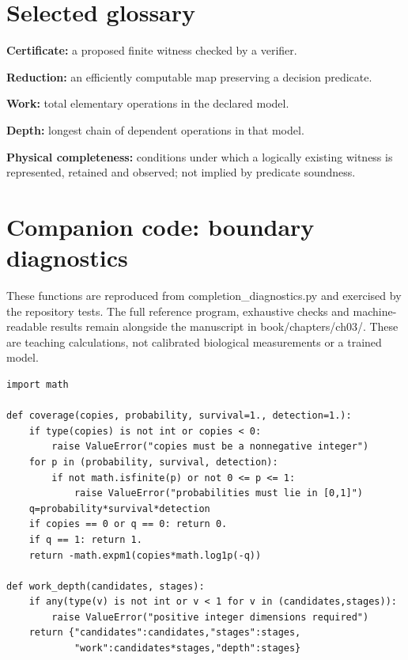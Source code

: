 \section{Selected glossary}\label{selected-glossary}

\textbf{Certificate:} a proposed finite witness checked by a verifier.

\textbf{Reduction:} an efficiently computable map preserving a decision
predicate.

\textbf{Work:} total elementary operations in the declared model.

\textbf{Depth:} longest chain of dependent operations in that model.

\textbf{Physical completeness:} conditions under which a logically
existing witness is represented, retained and observed; not implied by
predicate soundness.

\section{Companion code: boundary
diagnostics}\label{appendix-a.-executable-boundary-diagnostics}

These functions are reproduced from completion\_diagnostics.py and
exercised by the repository tests. The full reference program,
exhaustive checks and machine-readable results remain alongside the
manuscript in book/chapters/ch03/. These are teaching calculations, not
calibrated biological measurements or a trained model.

\begin{verbatim}
import math

def coverage(copies, probability, survival=1., detection=1.):
    if type(copies) is not int or copies < 0:
        raise ValueError("copies must be a nonnegative integer")
    for p in (probability, survival, detection):
        if not math.isfinite(p) or not 0 <= p <= 1:
            raise ValueError("probabilities must lie in [0,1]")
    q=probability*survival*detection
    if copies == 0 or q == 0: return 0.
    if q == 1: return 1.
    return -math.expm1(copies*math.log1p(-q))

def work_depth(candidates, stages):
    if any(type(v) is not int or v < 1 for v in (candidates,stages)):
        raise ValueError("positive integer dimensions required")
    return {"candidates":candidates,"stages":stages,
            "work":candidates*stages,"depth":stages}
\end{verbatim}

